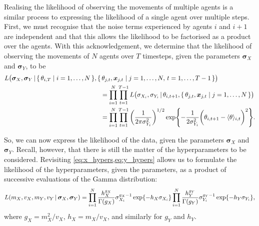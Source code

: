 Realising the likelihood of observing the movements of multiple agents is a similar process to 
expressing the likelihood of a single agent over multiple steps. First, we must recognise that the 
noise terms experienced by agents $i$ and $i+1$ are independent and that this allows the likelihood 
to be factorised as a product over the agents. With this acknowledgement, we determine that the 
likelihood of observing the movements of $N$ agents over $T$ timesteps, given the parameters 
$\bm{\sigma}_X$ and $\bm{\sigma}_Y$, to be
\begin{align}
\label{eq:data_likelihood}
\begin{split}
	L\big(\bm{\sigma}_X, \bm{\sigma}_Y  \,|\, \{\,\theta_{i, T} \mid i=1,\ldots,N\,\},  \{&\,\theta_{j, 
t}, \bm{x}_{j, t} \mid j= 1,\ldots, N, \, t=1,  \ldots,T-1\,\}\big) \\
	& = \prod_{i=1}^N \prod_{t=1}^{T-1} L\big(\sigma_{X_i}, \sigma_{Y_i} \,|\, \theta_{i, t+1},  
\{\,\theta_{j, t}, \bm{x}_{j, t} \mid j=1,\ldots,N\,\}\big) \\
	& = \prod_{i=1}^N \prod_{t=1}^{T-1} \bigg( \frac{1}{2\pi\sigma_{Y_i}^2} \bigg)^{1/2} 
\exp{-\frac{1}{2\sigma_{Y_i}^2} \bigg(\theta_{i, t+1} - \langle \theta \rangle_{i, t}\bigg)^2 }.
\end{split}
\end{align}

So, we can now express the likelihood of the data, given the parameters $\bm{\sigma}_X$ and 
$\bm{\sigma}_Y$. Recall, however, that there is still the matter of the hyperparameters to be 
considered. Revisiting \cref{eq:x_hypers,eq:y_hypers} allows us to formulate the likelihood of the 
hyperparameters, given the parameters, as a product of successive evaluations of the Gamma 
distribution:
\begin{equation}
\label{eq:param_likelihood}
	L(m_X, v_X, m_Y, v_Y \,|\, \bm{\sigma}_X, \bm{\sigma}_Y) = \prod_{i=1}^N 
\frac{h_X^{g_X}}{\Gamma(g_X)} \sigma_{X_i}^{g_X - 1} \exp{-h_X \sigma_{X_i}}  \prod_{i=1}^N 
\frac{h_Y^{g_Y}}{\Gamma(g_Y)} \sigma_{Y_i}^{g_Y - 1} \exp{-h_Y \sigma_{Y_i}},
\end{equation}
where $g_X = m_X^2 / v_X$, $h_X = m_X / v_X$, and similarly for $g_Y$ and $h_Y$.

